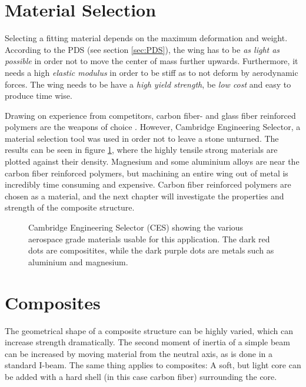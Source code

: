\section{Material Selection}

  Selecting a fitting material depends on the maximum deformation and weight. According to the PDS (see section \ref{sec:PDS}), the wing has to be \emph{as light as possible} in order not to move the center of mass further upwards. Furthermore, it needs a high \emph{elastic modulus} in order to be stiff as to not deform by aerodynamic forces. The wing needs to be have a \emph{high yield strength}, be \emph{low cost} and easy to produce time wise.

  Drawing on experience from competitors, carbon fiber- and glass fiber reinforced polymers are the weapons of choice \cite{FSwingmaterial}. However, Cambridge Engineering Selector, a material selection tool was used in order not to leave a stone unturned. The results can be seen in figure \ref{fig:CESmatchoice}, where the highly tensile strong materials are plotted against their density. Magnesium and some aluminium alloys are near the carbon fiber reinforced polymers, but machining an entire wing out of metal is incredibly time consuming and expensive. Carbon fiber reinforced polymers are chosen as a material, and the next chapter will investigate the properties and strength of the composite structure.

  \begin{figure}
    \caption{Cambridge Engineering Selector (CES) showing the various aerospace grade materials usable for this application. The dark red dots are compositites, while the dark purple dots are metals such as aluminium and magnesium.}
    \label{fig:CESmatchoice}
  \end{figure}

\section{Composites}

  The geometrical shape of a composite structure can be highly varied, which can increase strength dramatically. The second moment of inertia of a simple beam can be increased by moving material from the neutral axis, as is done in a standard I-beam. The same thing applies to composites: A soft, but light core can be added with a hard shell (in this case carbon fiber) surrounding the core.

